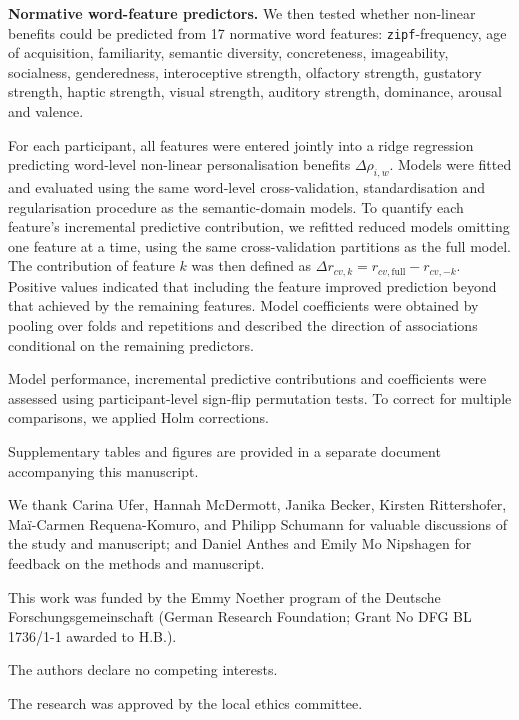 \documentclass[pdflatex,sn-mathphys]{sn-jnl}
\begin{document}
\textbf{Normative word-feature predictors.} We then tested whether non-linear benefits could be predicted from 17 normative word features: \texttt{zipf}-frequency, age of acquisition, familiarity, semantic diversity, concreteness, imageability, socialness, genderedness, interoceptive strength, olfactory strength, gustatory strength, haptic strength, visual strength, auditory strength, dominance, arousal and valence\cite{SUBTLEX,GLASGOW,LANCASTER}.

For each participant, all features were entered jointly into a ridge regression predicting word-level non-linear personalisation benefits $\Delta\rho_{i,w}$. Models were fitted and evaluated using the same word-level cross-validation, standardisation and regularisation procedure as the semantic-domain models. To quantify each feature's incremental predictive contribution, we refitted reduced models omitting one feature at a time, using the same cross-validation partitions as the full model. The contribution of feature $k$ was then defined as $\Delta r_{cv,k} = r_{cv,\mathrm{full}} - r_{cv,-k}$. Positive values indicated that including the feature improved prediction beyond that achieved by the remaining features. Model coefficients were obtained by pooling over folds and repetitions and described the direction of associations conditional on the remaining predictors.

Model performance, incremental predictive contributions and coefficients were assessed using participant-level sign-flip permutation tests. To correct for multiple comparisons, we applied Holm corrections.

\backmatter

 Supplementary tables and figures are provided in a separate document accompanying this manuscript.

 We thank Carina Ufer, Hannah McDermott, Janika Becker, Kirsten Rittershofer, Maï-Carmen Requena-Komuro, and Philipp Schumann for valuable discussions of the study and manuscript; and Daniel Anthes and Emily Mo Nipshagen for feedback on the methods and manuscript.

 This work was funded by the Emmy Noether program of the Deutsche Forschungsgemeinschaft (German Research Foundation; Grant No DFG BL 1736/1-1 awarded to H.B.).

 The authors declare no competing interests.

 The research was approved by the local ethics committee.
\end{document}
